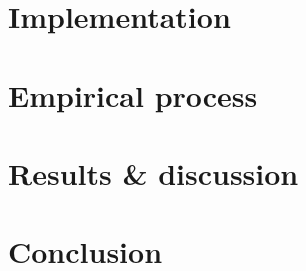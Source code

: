 \documentclass[conference]{IEEEtran}
\begin{document}
\section{\textbf{Implementation}}

\section{\textbf{Empirical process}}

\section{\textbf{Results \& discussion}}

\section{\textbf{Conclusion}}



\vspace{12pt}
\end{document}
